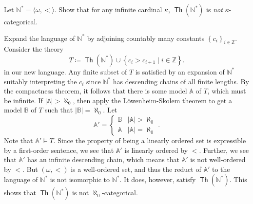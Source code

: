 \documentclass[10pt,letterpaper,cm]{nupset}
\theoremstyle{definition}
\theoremstyle{theorem}
\theoremstyle{remark}
\newcommand{\A}{\mathbb A}
\newcommand{\N}{\mathbb N}
\newcommand{\Z}{\mathbb Z}
\newcommand{\B}{\mathbb{B}}
\newcommand{\1}{\mathbb{1}}
\newcommand{\0}{\vec 0}
\DeclareMathOperator{\thh}{\mathsf{Th}}
\begin{document}
\begin{problem}[3.]
Let $\N^{\ast} = \langle \omega, <\rangle$. Show that for any infinite cardinal $\kappa$, $\thh(\N^{\ast})$ is \emph{not} $\kappa$-categorical.
\end{problem}
\begin{solution}
Expand the language of $\N^{\ast}$ by adjoining countably many constants $\left\{c_i\right\}_{i\in \Z}$. Consider the theory
\[ \label{eqn:st1}
T \coloneqq \thh(\N^{\ast}) \cup \left\{ c_i > c_{i+1} \mid i\in \Z \right\}. \tag{$\star$}
\] in our new language.  Any finite subset of $T$ is satisfied by an expansion of $\N^{\ast}$ suitably interpreting the $c_i$ since $\N^{\ast}$ has descending chains of all finite lengths. By the compactness theorem, it follows that there is some model $\A$ of $T$, which must be infinite. If $\left\lvert{\A}\right\rvert >\aleph_0$, then apply the L\"owenheim-Skolem theorem to get a model $\B$ of $T$ such that $\left\lvert{\B}\right\rvert = \aleph_0$.  Let 
\[
\A' = \begin{cases} \B & \left\lvert{\A}\right\rvert >\aleph_0
\\ \A & \left\lvert{\A}\right\rvert =\aleph_0
\end{cases}.
\] Note that $\A' \models T$. Since the property of being a linearly ordered set is expressible by a first-order sentence, we see that $\A'$ is linearly ordered by $<$. Further, we see that $\A'$ has an infinite descending chain, which means that $\A'$ is not well-ordered by $<$.  But $\left(\omega, <\right)$ is a well-ordered set, and thus the reduct of $\A'$ to the language of $\N^{\ast}$ is not isomorphic to $\N^{\ast}$. It does, however, satisfy $\thh(\N^{\ast})$. This shows that $\thh(\N^{\ast})$ is not $\aleph_0$-categorical.

\medskip


\end{solution}
\end{document}
